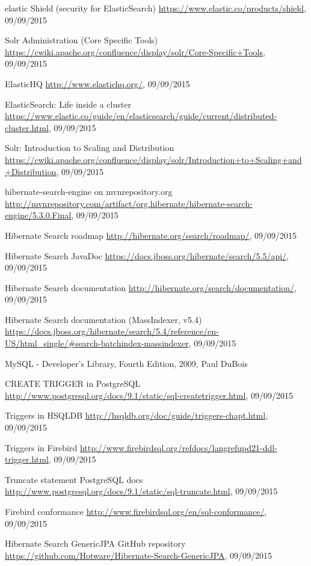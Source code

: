 \begin{thebibliography}{100}
	 elastic Shield (security for ElasticSearch)
	\url{https://www.elastic.co/products/shield}, 09/09/2015
	
	 Solr Administration (Core Specific Tools)
	\url{https://cwiki.apache.org/confluence/display/solr/Core-Specific+Tools}, 09/09/2015
	
	 ElasticHQ
	\url{http://www.elastichq.org/}, 09/09/2015
	
	 ElasticSearch: Life inside a cluster
	\url{https://www.elastic.co/guide/en/elasticsearch/guide/current/distributed-cluster.html}, 09/09/2015
	
	 Solr: Introduction to Scaling and Distribution
	\url{https://cwiki.apache.org/confluence/display/solr/Introduction+to+Scaling+and+Distribution}, 09/09/2015
	
	 hibernate-search-engine on mvnrepository.org
	\url{http://mvnrepository.com/artifact/org.hibernate/hibernate-search-engine/5.3.0.Final}, 09/09/2015
	
	 Hibernate Search roadmap
	\url{http://hibernate.org/search/roadmap/}, 09/09/2015
	
	 Hibernate Search JavaDoc
	\url{https://docs.jboss.org/hibernate/search/5.5/api/}, 09/09/2015
	
	 Hibernate Search documentation
	\url{http://hibernate.org/search/documentation/}, 09/09/2015
	
	 Hibernate Search documentation (MassIndexer, v5.4)
	\url{https://docs.jboss.org/hibernate/search/5.4/reference/en-US/html_single/#search-batchindex-massindexer}, 09/09/2015
	
	 MySQL - Developer's Library, Fourth Edition, 2009, Paul DuBois
	
	 CREATE TRIGGER in PostgreSQL
	\url{http://www.postgresql.org/docs/9.1/static/sql-createtrigger.html}, 09/09/2015
	
	 Triggers in HSQLDB
	\url{http://hsqldb.org/doc/guide/triggers-chapt.html}, 09/09/2015
	
	 Triggers in Firebird
	\url{http://www.firebirdsql.org/refdocs/langrefupd21-ddl-trigger.html}, 09/09/2015
	
	 Truncate statement PostgreSQL docs
	\url{http://www.postgresql.org/docs/9.1/static/sql-truncate.html}, 09/09/2015
	
	 Firebird conformance
	\url{http://www.firebirdsql.org/en/sql-conformance/}, 09/09/2015
	
	 Hibernate Search GenericJPA GitHub repository
	\url{https://github.com/Hotware/Hibernate-Search-GenericJPA}, 09/09/2015
	
	
\end{thebibliography}

\pagebreak
~
